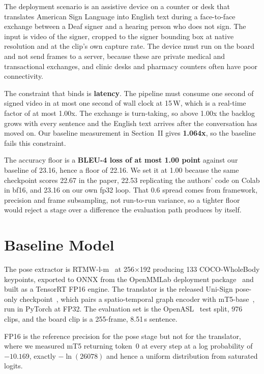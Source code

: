 \documentclass[conference]{IEEEtran}
\begin{document}
The deployment scenario is an assistive device on a counter or desk that translates
American Sign Language into English text during a face-to-face exchange between a Deaf
signer and a hearing person who does not sign. The input is video of
the signer, cropped to the signer bounding box at native resolution and at the clip's own
capture rate. The device must run on the board and not send frames to a server, because
these are private medical and transactional exchanges, and clinic desks and pharmacy
counters often have poor connectivity.

The constraint that binds is \textbf{latency}. The pipeline must consume one second of
signed video in at most one second of wall clock at 15\,W, which is a real-time factor of
at most 1.00x. The exchange is turn-taking, so above 1.00x the backlog grows with
every sentence and the English text arrives after the conversation has moved on. Our baseline measurement in Section~II gives
\textbf{1.064x}, so the baseline fails this constraint.

The accuracy floor is a \textbf{BLEU-4 loss of at most 1.00 point} against our baseline of
23.16, hence a floor of 22.16. We set it at 1.00 because the same checkpoint scores 22.67
in the paper, 22.53 replicating the authors' code on Colab in bf16, and 23.16 on our own
fp32 loop. That 0.6 spread comes from framework, precision and frame subsampling, not
run-to-run variance, so a tighter floor would reject a stage over a difference the
evaluation path produces by itself.

\section{Baseline Model}

The pose extractor is RTMW-l-m~\cite{rtmw} at 256$\times$192 producing 133 COCO-WholeBody keypoints, exported
to ONNX from the OpenMMLab deployment package~\cite{mmpose} and built as a TensorRT FP16 engine. The
translator is the released Uni-Sign pose-only checkpoint~\cite{unisign}, which pairs a
spatio-temporal graph encoder with mT5-base~\cite{mt5}, run in PyTorch at FP32. The
evaluation set is the OpenASL~\cite{openasl} test split, 976 clips, and the board clip is
a 255-frame, 8.51\,s sentence.

FP16 is the reference precision for the pose stage but not for the translator, where we
measured mT5 returning token~0 at every step at a log probability of $-10.169$, exactly
$-\ln(26078)$ and hence a uniform distribution from saturated logits.
\end{document}
